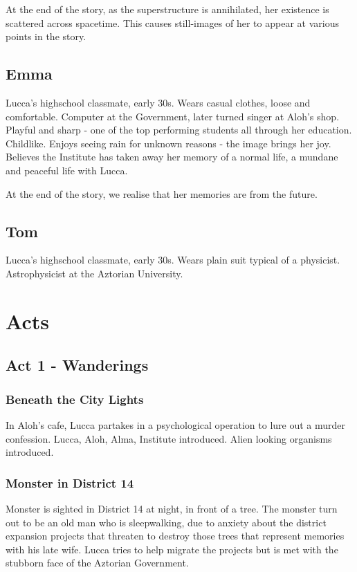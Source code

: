 \documentclass[11pt]{article}
\begin{document}
	At the end of the story, as the superstructure is annihilated, her existence is scattered across spacetime. 
	This causes still-images of her to appear at various points in the story. 
	\subsection{Emma}
	Lucca's highschool classmate, early 30s.
	Wears casual clothes, loose and comfortable. 
	Computer at the Government, later turned singer at Aloh's shop.
	Playful and sharp - one of the top performing students all through her education.
	Childlike.
	Enjoys seeing rain for unknown reasons - the image brings her joy. 
	Believes the Institute has taken away her memory of a normal life, a mundane and peaceful life with Lucca.
	
	At the end of the story, we realise that her memories are from the future.
	\subsection{Tom}
	Lucca's highschool classmate, early 30s.
	Wears plain suit typical of a physicist.
	Astrophysicist at the Aztorian University. 
	
\newpage






\section{Acts}
	\subsection{Act 1 - Wanderings}
		\subsubsection{Beneath the City Lights}
		In Aloh's cafe, Lucca partakes in a psychological operation to lure out a murder confession.
		Lucca, Aloh, Alma, Institute introduced.
		Alien looking organisms introduced. 
		\subsubsection{Monster in District 14}
		Monster is sighted in District 14 at night, in front of a tree.
		The monster turn out to be an old man who is sleepwalking, due to anxiety about the district expansion projects that threaten to destroy those trees that represent memories with his late wife.
		Lucca tries to help migrate the projects but is met with the stubborn face of the Aztorian Government.
\end{document}
